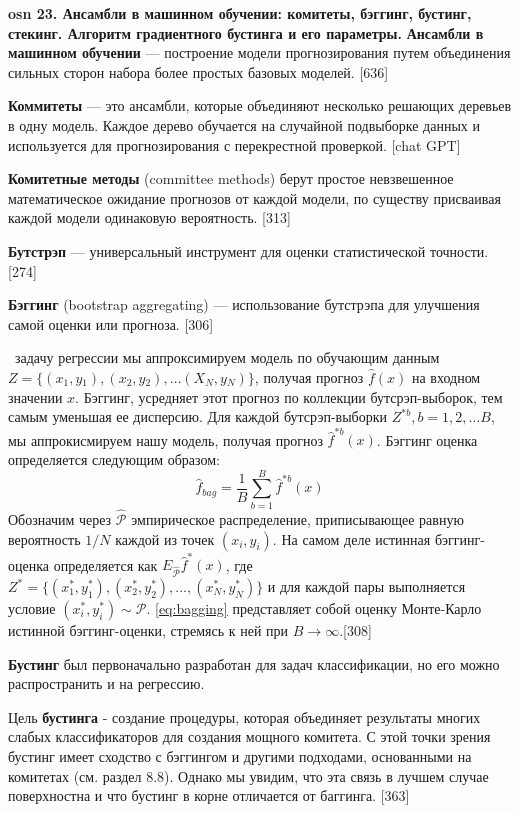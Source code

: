 \textbf{\LARGE osn 23. Ансамбли в машинном обучении: комитеты, бэггинг, бустинг, стекинг. Алгоритм градиентного бустинга и его параметры.}
\textbf{Ансамбли в машинном обучении} --- построение модели прогнозирования путем объединения сильных сторон набора более простых базовых моделей. [636]

\textbf{Коммитеты} ---  это ансамбли, которые объединяют несколько решающих деревьев в одну модель. Каждое дерево обучается на случайной подвыборке данных и используется для прогнозирования с перекрестной проверкой. [chat GPT]

\textbf{Комитетные методы} (committee methods) берут простое невзвешенное математическое ожидание прогнозов от каждой модели, по существу присваивая каждой модели одинаковую вероятность. [313]


\textbf{Бутстрэп} --- универсальный инструмент для оценки статистической точности. [274]

\textbf{Бэггинг} (bootstrap aggregating) --- использование бутстрэпа для улучшения самой оценки или прогноза. 
[306]


\faEye \ задачу регрессии \mathLe мы аппроксимируем модель по обучающим данным $Z = \{(x{_1}, y{_1}),(x{_2}, y{_2}), \dots (X{_N}, y{_N})\}$, получая прогноз $\hat{f}(x)$ на входном значении $x$. Бэггинг, усредняет этот прогноз по коллекции бутсрэп-выборок, тем самым уменьшая ее дисперсию. Для каждой бутсрэп-выборки $Z^{*b}, b = 1, 2, \dots B$, мы аппрокисмируем нашу модель, получая прогноз $\hat{f}^{*b}(x)$. Бэггинг оценка определяется следующим образом:
\begin{equation}
    {\hat{f}_{bag} = \frac{1}{B}\sum_{b=1}^{B} \hat{f}^{*b}(x) } \label{eq:bagging}
\end{equation}
Обозначим через $\hat{\mathcal{P}}$ эмпирическое распределение, приписывающее равную вероятность $1/N$ каждой из точек $(x_i,y_i)$. На самом деле истинная бэггинг-оценка определяется как $E_{\hat{\mathcal{P}}}\hat{f}^{*}(x)$, где $Z^*=\{(x_1^*, y_1^*), (x_2^*, y_2^*), \dots, (x_N^*, y_N^*)\}$ и для каждой пары выполняется условие $(x_i^*, y_i^*) \sim \mathcal{P} $. \autoref{eq:bagging} представляет собой оценку Монте-Карло истинной бэггинг-оценки, стремясь к ней при $B \to \infty$.[308]


\textbf{Бустинг} был первоначально разработан для задач классификации, но его можно распространить и на регрессию.


Цель \textbf{бустинга} - создание процедуры, которая объединяет результаты многих слабых классификаторов для создания мощного комитета. С этой точки зрения бустинг имеет сходство с бэггингом и другими подходами, основанными на комитетах (см. раздел 8.8). Однако мы увидим, что эта связь в лучшем случае поверхностна и что бустинг в корне отличается от баггинга. [363]


